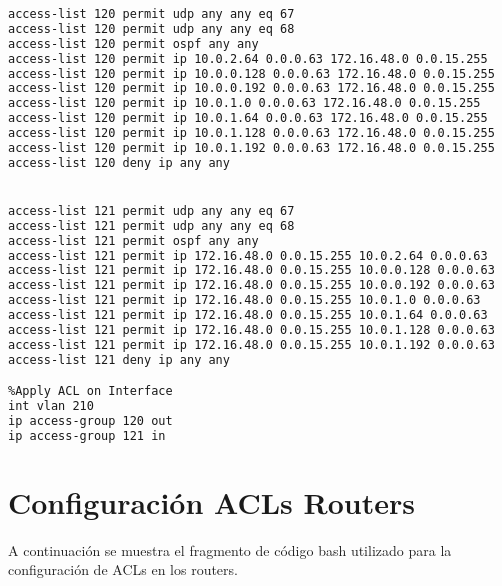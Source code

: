 \begin{lstlisting}[language=Bash, caption={Configuración ACLs Switch IoMt Plantas 0, 1 y 2}]
%Declare ACL
access-list 120 permit udp any any eq 67            
access-list 120 permit udp any any eq 68
access-list 120 permit ospf any any
access-list 120 permit ip 10.0.2.64 0.0.0.63 172.16.48.0 0.0.15.255
access-list 120 permit ip 10.0.0.128 0.0.0.63 172.16.48.0 0.0.15.255
access-list 120 permit ip 10.0.0.192 0.0.0.63 172.16.48.0 0.0.15.255
access-list 120 permit ip 10.0.1.0 0.0.0.63 172.16.48.0 0.0.15.255
access-list 120 permit ip 10.0.1.64 0.0.0.63 172.16.48.0 0.0.15.255
access-list 120 permit ip 10.0.1.128 0.0.0.63 172.16.48.0 0.0.15.255
access-list 120 permit ip 10.0.1.192 0.0.0.63 172.16.48.0 0.0.15.255
access-list 120 deny ip any any


access-list 121 permit udp any any eq 67            
access-list 121 permit udp any any eq 68
access-list 121 permit ospf any any
access-list 121 permit ip 172.16.48.0 0.0.15.255 10.0.2.64 0.0.0.63 
access-list 121 permit ip 172.16.48.0 0.0.15.255 10.0.0.128 0.0.0.63 
access-list 121 permit ip 172.16.48.0 0.0.15.255 10.0.0.192 0.0.0.63 
access-list 121 permit ip 172.16.48.0 0.0.15.255 10.0.1.0 0.0.0.63 
access-list 121 permit ip 172.16.48.0 0.0.15.255 10.0.1.64 0.0.0.63 
access-list 121 permit ip 172.16.48.0 0.0.15.255 10.0.1.128 0.0.0.63 
access-list 121 permit ip 172.16.48.0 0.0.15.255 10.0.1.192 0.0.0.63
access-list 121 deny ip any any

%Apply ACL on Interface
int vlan 210
ip access-group 120 out
ip access-group 121 in
\end{lstlisting}

\section{Configuración ACLs Routers}\label{anexo:aclRout}
A continuación se muestra el fragmento de código bash utilizado para la configuración de ACLs en los routers.

